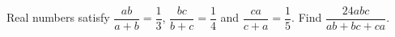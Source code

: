 Real numbers satisfy $\dfrac{ab}{a+b}=\dfrac{1}{3}$, $\dfrac{bc}{b+c}=\dfrac{1}{4}$ and $\dfrac{ca}{c+a}=\dfrac{1}{5}$. Find $\dfrac{24abc}{ab+bc+ca}$.
